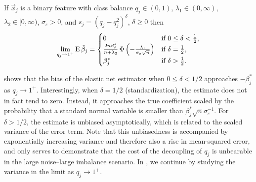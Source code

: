 \begin{theorem}
  \label{thm:classbalance-bias}
  If \(\vec{x}_j\) is a binary feature with class balance \(q_j \in (0, 1)\), \(\lambda_1 \in (0,\infty)\), \(\lambda_2 \in [0,\infty)\), \(\sigma_\varepsilon > 0\), and \(s_j = (q_j - q_j^2)^{\delta}\), \(\delta \geq 0\)  then
  \[
    \lim_{q_j \rightarrow 1^+} \operatorname{E} \hat{\beta}_j =
    \begin{cases}
      0                                                                                                  & \text{if } 0 \leq \delta < \frac{1}{2}, \\
      \frac{2n \beta_j^*}{n + \lambda_2} \operatorname{\Phi}\left(-\frac{\lambda_1}{\sigma_\varepsilon \sqrt{n}}\right) & \text{if } \delta = \frac{1}{2},        \\
      \beta^*_j                                                                                          & \text{if } \delta > \frac{1}{2}.
    \end{cases}
  \]
\end{theorem}


 shows that the bias of the elastic net estimator when \(0 \leq
\delta < 1/2\) approaches \(-\beta_j^*\) as \(q_j \rightarrow 1^+\). Interestingly, when
\(\delta = 1/2\) (standardization), the estimate does not in fact tend to zero. Instead, it
approaches the true coefficient scaled by the probability that a standard normal variable
is smaller than \(\beta_j^*\sqrt{n}\sigma_\varepsilon^{-1}\). For \(\delta > 1/2\), the
estimate is unbiased asymptotically, which is related to the scaled variance of the error
term. Note that this unbiasedness is accompanied by exponentially increasing variance and
therefore also a rise in mean-squared error, and only serves to demonstrate that the cost
of the decoupling of \(q_j\) is unbearable in the large noise--large imbalance scenario. In
, we continue by studying the variance in the limit as
\(q_j \rightarrow 1^+\).

